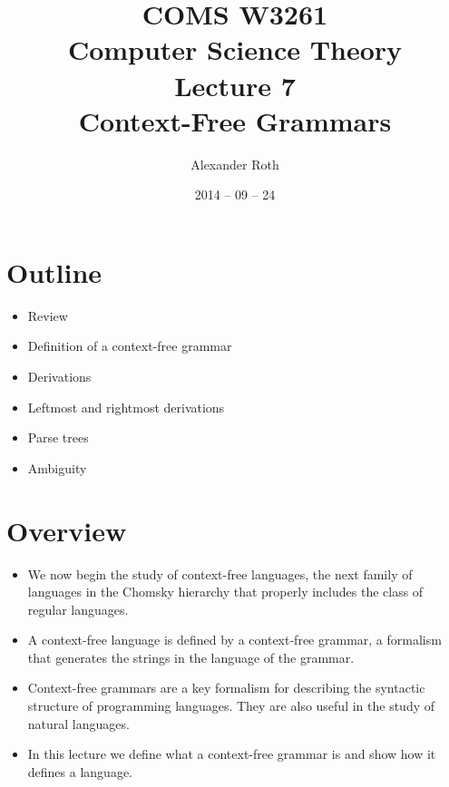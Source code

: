 \documentclass[]{article}
\begin{document}
\title{COMS W3261 \\ Computer Science Theory \\ Lecture 7\\ Context-Free 
Grammars}
\author{Alexander Roth}
\date{2014 -- 09 -- 24}
\maketitle

\section*{Outline}
  \begin{itemize}
    \item Review
    \item Definition of a context-free grammar
    \item Derivations
    \item Leftmost and rightmost derivations
    \item Parse trees
    \item Ambiguity
  \end{itemize}
  
\section{Overview}
  \begin{itemize}
    \item We now begin the study of context-free languages, the next family of
    languages in the Chomsky hierarchy that properly includes the class of
    regular languages.
    \item A context-free language is defined by a context-free grammar, a
    formalism that generates the strings in the language of the grammar.
    \item Context-free grammars are a key formalism for describing the syntactic
    structure of programming languages. They are also useful in the study of
    natural languages.
    \item In this lecture we define what a context-free grammar is and show how
    it defines a language.
  \end{itemize}
  
\end{document}
